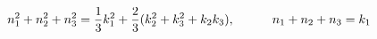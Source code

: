 \begin{equation}
 n_1^2 + n_2^2 +n_3^2 = {1\over 3} k_1^2 + {2\over 3} (k_2^2
 +k_3^2 + k_2 k_3), \qquad \quad n_1 + n_2 + n_3 = k_1
\end{equation}

